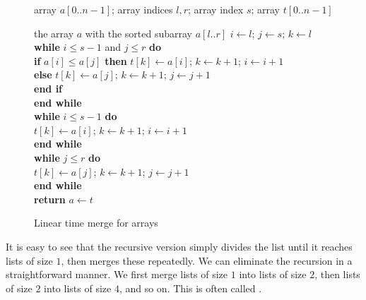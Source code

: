 \begin{figure}[htb!]
\hspace*{.5in}\begin{minipage}{5in}
{
\begin{minipage}[t]{5in}
array $a[0..n-1]$; array indices $l, r$; array index $s$; array $t[0..n-1]$\\ 
\end{minipage}
}
{the array $a$ with the sorted subarray $a[l..r]$ }
{
\> \(i\leftarrow l\); \(j \leftarrow s\); \(k\leftarrow l\)\\ 
\> \textbf{while} \(i \le s-1\) and \(j \le r\) 
                 \textbf{do}\\ %
\> \>\textbf{if} \(a[i] \le a[j]\) \textbf{then} 
        \(t[k] \leftarrow a[i]\);
        \(k \leftarrow k + 1\); \(i \leftarrow i + 1\)\\
\> \>\textbf{else} \hspace{19mm}
        \(t[k] \leftarrow a[j]\);
        \(k \leftarrow k + 1\); \(j \leftarrow j + 1\)\\
\> \>\textbf{end if}\\
\> \textbf{end while} \\
\> \textbf{while} \(i \le s-1\) \textbf{do}
      \hspace{10mm}\\
\> \>\(t[k] \leftarrow a[i]\);
             \(k\leftarrow k + 1\); \(i\leftarrow i + 1\)\\
\> \textbf{end while} \\
\> \textbf{while} \(j \le r\) \textbf{do}
      \hspace{15mm}\\
\> \>\(t[k]\leftarrow a[j]\);
         \(k\leftarrow k + 1\); \(j\leftarrow j + 1\)\\
\> \textbf{end while} \\
\> \textbf{return} $a\gets t$ \\
} 
\end{minipage}
\caption{\label{merge} Linear time merge for arrays}
\end{figure} 


It is easy to see that the recursive version simply divides the list until it 
reaches lists of size $1$, then merges these repeatedly. We can eliminate the 
recursion in a straightforward manner. We first merge lists of 
size $1$ into lists of size $2$, then lists of size $2$ into lists of size $4$, 
and so on. This is often called .

